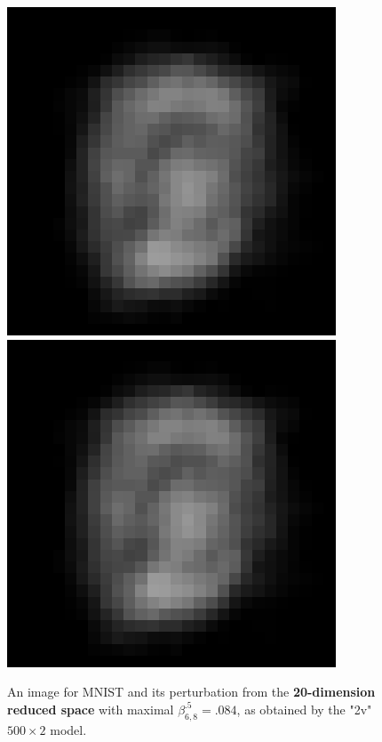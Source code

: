 \begin{figure}[t!]
	\centering
\includegraphics[scale=0.5]{redimage.png} \hspace{1.5cm}
\includegraphics[scale=0.5]{redperturb.png}
\caption{An image for MNIST and its perturbation from the {\bf 20-dimension reduced space} with maximal $\beta^{.5}_{6,8}=.084$, as obtained by the "2v" $500 \times 2$ model.}
\label{fig4}
\end{figure}	


